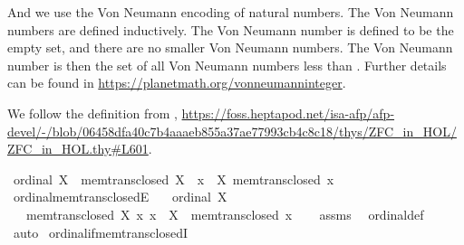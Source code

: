 \begin{isabellebody}
\begin{isamarkuptext}
And we use the Von Neumann encoding of natural numbers. The Von Neumann numbers
are defined inductively. The Von Neumann number  is defined to be the empty set, 
and there are no smaller Von Neumann numbers. The Von Neumann number  is then the set of 
all Von Neumann numbers less than . Further details can be found in
\url{https://planetmath.org/vonneumanninteger}.%
\end{isamarkuptext}\isamarkuptrue%
%
\isadelimdocument
%
\endisadelimdocument
%
\isatagdocument
%
\isamarkuptrue%
%
\endisatagdocument
{\isafolddocument}%
%
\isadelimdocument
%
\endisadelimdocument
%
\begin{isamarkuptext}%
We follow the definition from \cite{ZFC_in_HOL_AFP},
 \url{https://foss.heptapod.net/isa-afp/afp-devel/-/blob/06458dfa40c7b4aaaeb855a37ae77993cb4c8c18/thys/ZFC_in_HOL/ZFC_in_HOL.thy\#L601}.%
\end{isamarkuptext}\isamarkuptrue%
\isamarkupfalse%
\ {\isachardoublequoteopen}ordinal\ X\ {\isasymequiv}\ mem{\isacharunderscore}{\kern0pt}trans{\isacharunderscore}{\kern0pt}closed\ X\ {\isasymand}\ {\isacharparenleft}{\kern0pt}{\isasymforall}x\ {\isasymin}\ X{\isachardot}{\kern0pt}\ mem{\isacharunderscore}{\kern0pt}trans{\isacharunderscore}{\kern0pt}closed\ x{\isacharparenright}{\kern0pt}{\isachardoublequoteclose}\isanewline
\isanewline
{}\isamarkupfalse%
\ ordinal{\isacharunderscore}{\kern0pt}mem{\isacharunderscore}{\kern0pt}trans{\isacharunderscore}{\kern0pt}closedE{\isacharcolon}{\kern0pt}\isanewline
\ \ \ {\isachardoublequoteopen}ordinal\ X{\isachardoublequoteclose}\isanewline
\ \ \ {\isachardoublequoteopen}mem{\isacharunderscore}{\kern0pt}trans{\isacharunderscore}{\kern0pt}closed\ X{\isachardoublequoteclose}\ {\isachardoublequoteopen}{\isasymAnd}x{\isachardot}{\kern0pt}\ x\ {\isasymin}\ X\ {\isasymLongrightarrow}\ mem{\isacharunderscore}{\kern0pt}trans{\isacharunderscore}{\kern0pt}closed\ x{\isachardoublequoteclose}\isanewline
%
\isadelimproof
\ \ %
\endisadelimproof
%
\isatagproof
{}\isamarkupfalse%
\ assms\ \isamarkupfalse%
\ ordinal{\isacharunderscore}{\kern0pt}def\ \isamarkupfalse%
\ auto%
\endisatagproof
{\isafoldproof}%
%
\isadelimproof
\isanewline
%
\endisadelimproof
\isanewline
{}\isamarkupfalse%
\ ordinal{\isacharunderscore}{\kern0pt}if{\isacharunderscore}{\kern0pt}mem{\isacharunderscore}{\kern0pt}trans{\isacharunderscore}{\kern0pt}closedI{\isacharcolon}{\kern0pt}\isanewline

\end{isabellebody}

